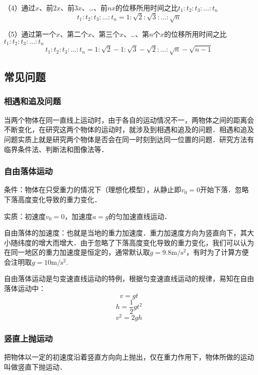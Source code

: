 （4）通过$x$、前$2x$、前$3x$、…、前$nx$的位移所用时间之比$t_1:t_2:t_3:\dots:t_n$
\begin{equation}
t_1:t_2:t_3:\dots:t_n=1:\sqrt{2}:\sqrt{3}:\dots:\sqrt{n}
\end{equation}

（5）通过第一个$x$、第二个$x$、第三个$x$、…、第$n$个$x$的位移所用时间之比$t_1:t_2:t_3:\dots:t_n$
\begin{equation}
t_1:t_2:t_3:\dots:t_n=1:\sqrt{2}-1:\sqrt{3}-\sqrt{2}:\dots:\sqrt{n}-\sqrt{n-1}
\end{equation}

\subsection{常见问题}
\subsubsection{相遇和追及问题}
当两个物体在同一直线上运动时，由于各自的运动情况不一，两物体之间的距离会不断变化，在研究这两个物体的运动时，就涉及到相遇和追及的问题．相遇和追及问题实质上就是研究两个物体是否会在同一时刻到达同一位置的问题．研究方法有临界条件法、判断法和图像法等．

\subsubsection{自由落体运动}
条件：物体在只受重力的情况下（理想化模型），从静止即$v_0=0$开始下落．忽略下落高度变化导致的重力变化．

实质：初速度$v_0=0$，加速度$a=g$的匀加速直线运动．

自由落体的加速度：也就是当地的重力加速度．重力加速度方向为竖直向下，其大小随纬度的增大而增大．由于忽略了下落高度变化导致的重力变化，我们可以认为在同一地区的重力加速度是恒定的，通常默认取$g=9.8\mathrm{m/s^2}$，有时为了计算方便会注明取$g=10\mathrm{m/s^2}$.

自由落体运动是匀变速直线运动的特例，根据匀变速直线运动的规律，易知在自由落体运动中：
\begin{equation}
v=gt
\end{equation}
\begin{equation}
h=\frac12gt^2
\end{equation}
\begin{equation}
v^2=2gh
\end{equation}

\subsubsection{竖直上抛运动}
把物体以一定的初速度沿着竖直方向向上抛出，仅在重力作用下，物体所做的运动叫做竖直下抛运动．

